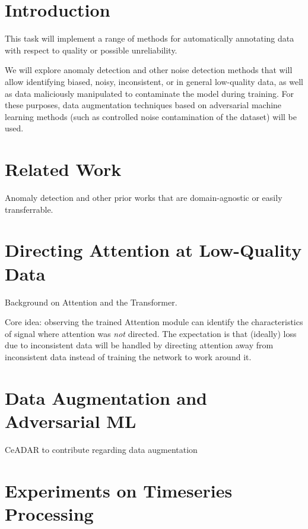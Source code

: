 
\section{Introduction}

This task will implement a range of methods for automatically
annotating data with respect to quality or possible unreliability.

We will explore anomaly detection and other noise detection methods
that will allow identifying biased, noisy, inconsistent, or in general
low-quality data, as well as data maliciously manipulated to
contaminate the model during training. For these purposes, data
augmentation techniques based on adversarial machine learning methods
(such as controlled noise contamination of the dataset) will be used.

\section{Related Work}

Anomaly detection and other prior works that are domain-agnostic or
easily transferrable.


\section{Directing Attention at Low-Quality Data}

Background on Attention and the Transformer.

Core idea: observing the trained Attention module can identify the
characteristics of signal where attention was \emph{not} directed.
The expectation is that (ideally) loss due to inconsistent data will
be handled by directing attention away from inconsistent data instead
of training the network to work around it.


\section{Data Augmentation and Adversarial ML}

%
{CeADAR to contribute regarding data augmentation}


\section{Experiments on Timeseries Processing}

